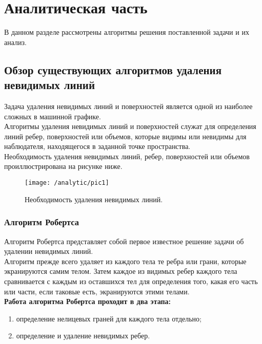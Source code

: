 \newpage
\section{Аналитическая часть}\label{sec:analytic}

В данном разделе рассмотрены алгоритмы решения поставленной задачи и их анализ.

\subsection{Обзор существующих алгоритмов удаления невидимых линий}\label{subsec:analytic1.1}
 
Задача удаления невидимых линий и поверхностей является одной из наиболее сложных в машинной графике.\\

Алгоритмы удаления невидимых линий и поверхностей служат для определения линий ребер, поверхностей или объемов, которые видимы или невидимы для наблюдателя, находящегося в заданной точке пространства.\\

Необходимость удаления невидимых линий, ребер, поверхностей или объемов проиллюстрирована на рисунке ниже.

\begin{figure}[H]
\center
\texttt{[image: /analytic/pic1]}
\caption{Необходимость удаления невидимых линий.}
\end{figure}

\subsubsection{Алгоритм Робертса}\label{subsec:analytic1.1.1}

Алгоритм Робертса представляет собой первое известное решение задачи об удалении невидимых линий.\\

Алгоритм прежде всего удаляет из каждого тела те ребра или грани, которые экранируются самим телом. Затем каждое из видимых ребер каждого тела сравнивается с каждым из оставшихся тел для определения того, какая его часть или части, если таковые есть, экранируются этими телами.\\

\textbf{Работа алгоритма Робертса проходит в два этапа:}

\begin{enumerate}
	\item определение нелицевых граней для каждого тела отдельно;
	\item определение и удаление невидимых ребер.
\end{enumerate}

